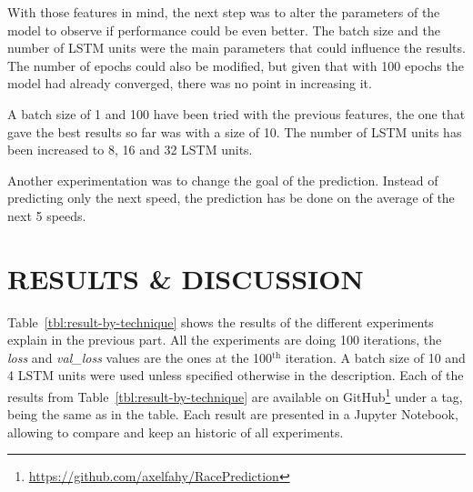 \documentclass[a4paper, 10pt, conference]{ieeeconf}      %
\begin{document}
With those features in mind, the next step was to alter the parameters of the model to observe if performance could be even better. The batch size and the number of LSTM units were the main parameters that could influence the results. The number of epochs could also be modified, but given that with 100 epochs the model had already converged, there was no point in increasing it.

A batch size of 1 and 100 have been tried with the previous features, the one that gave the best results so far was with a size of 10. The number of LSTM units has been increased to 8, 16 and 32 LSTM units.

Another experimentation was to change the goal of the prediction. Instead of predicting only the next speed, the prediction has be done on the average of the next 5 speeds.

\section{RESULTS \& DISCUSSION}

Table~\ref{tbl:result-by-technique} shows the results of the different experiments explain in the previous part. All the experiments are doing 100 iterations, the \textit{loss} and \textit{val\_loss} values are the ones at the 100$^{\textrm{th}}$ iteration. A batch size of 10 and 4 LSTM units were used unless specified otherwise in the description. Each of the results from Table~\ref{tbl:result-by-technique} are available on GitHub\footnote{\url{https://github.com/axelfahy/RacePrediction}} under a tag, being the same as in the table. Each result are presented in a Jupyter Notebook, allowing to compare and keep an historic of all experiments.
\end{document}
